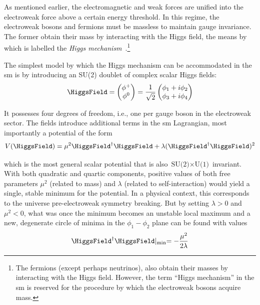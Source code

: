As mentioned earlier, the electromagnetic and weak forces are unified into the electroweak force above a certain energy threshold. In this regime, the electroweak bosons and fermions must be massless to maintain gauge invariance. The former obtain their mass by interacting with the Higgs field, the means by which is labelled the \emph{Higgs mechanism}~\cite{PhysRevLett.13.321,PhysRevLett.13.508,PhysRevLett.13.585}.\footnote{The fermions (except perhaps neutrinos), also obtain their masses by interacting with the Higgs field. However, the term ``Higgs mechanism'' in the \acrlong{sm} is reserved for the procedure by which the electroweak bosons acquire mass.} 

The simplest model by which the Higgs mechanism can be accommodated in the \acrshort{sm} is by introducing an SU(2) doublet of complex scalar Higgs fields:
\begin{equation}
    \HiggsField = \begin{pmatrix} \phi^+ \\ \phi^0 \end{pmatrix} = \frac{1}{\sqrt{2}} \begin{pmatrix} \phi_1 + i\phi_2 \\ \phi_3 + i\phi_4 \end{pmatrix}
    \label{eq:higgs_field}
\end{equation}

It possesses four degrees of freedom, i.e., one per gauge boson in the electroweak sector. The fields introduce additional terms in the \acrlong{sm} Lagrangian, most importantly a potential of the form
\begin{equation}
    V(\HiggsField) = \mu^2 \HiggsField^{\dagger} \HiggsField + \lambda (\HiggsField^{\dagger} \HiggsField)^2
    \label{eq:higgs_potential}
\end{equation}

which is the most general scalar potential that is also $\text{SU(2)} \times \text{U(1)}$ invariant. With both quadratic and quartic components, positive values of both free parameters $\mu^2$ (related to mass) and $\lambda$ (related to self-interaction) would yield a single, stable minimum for the potential. In a physical context, this corresponds to the universe pre-electroweak symmetry breaking. But by setting $\lambda > \text{0}$ and $\mu^2 < \text{0}$, what was once the minimum becomes an unstable local maximum and a new, degenerate circle of minima in the $\phi_1 - \phi_2$ plane can be found with values
\begin{equation}
    \HiggsField^{\dagger} \HiggsField \lvert_{\mathrm{min}} = -\frac{\mu^2}{2\lambda}
    \label{eq:higgs_mu_lambda}
\end{equation}

